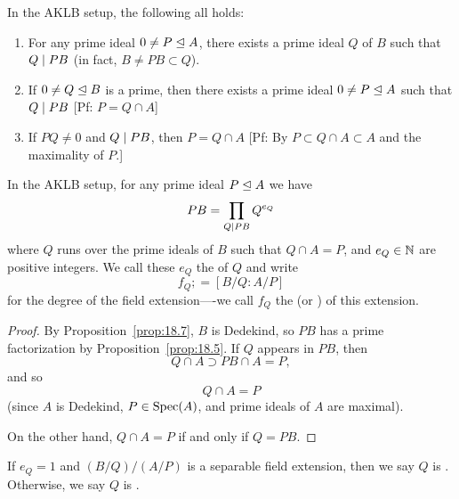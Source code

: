 \begin{fact}
In the AKLB setup, the following all holds:
\begin{enumerate}
\item For any prime ideal $0\neq P\mathrel{\trianglelefteq} A$, there exists a prime
  ideal $Q$ of $B$ such that $Q\mid PB$ (in fact, $B\neq PB\subset Q$).
\item If $0\neq Q\mathrel{\trianglelefteq} B$ is a prime, then there exists a prime ideal $0\neq P\mathrel{\trianglelefteq} A$
  such that $Q\mid PB$ [Pf: $P=Q\cap A$]
\item If $PQ\neq0$ and $Q\mid PB$, then $P=Q\cap A$
  [Pf: By $P\subset Q\cap A\subset A$ and the maximality of $P$.]
\end{enumerate}
\end{fact}

\begin{lemma}\label{lemma:19.2}
In the AKLB setup, for any prime ideal $P\mathrel{\trianglelefteq} A$ we have
\begin{equation}
PB=\prod_{Q\mid PB}Q^{e_{Q}}
\end{equation}
where $Q$ runs over the prime ideals of $B$ such that $Q\cap A=P$,
and $e_{Q}\in\mathbb{N}$ are positive integers. We call these $e_{Q}$ the
 of $Q$ and write
\begin{equation}
f_{Q};=[B/Q : A/P]
\end{equation}
for the degree of the field extension----we call $f_{Q}$ the
 (or ) of this extension.
\end{lemma}

\begin{proof}
By Proposition~\ref{prop:18.7}, $B$ is Dedekind, so $PB$ has a prime
factorization by Proposition~\ref{prop:18.5}. If $Q$ appears in $PB$,
then
\begin{equation}
Q\cap A\supset PB\cap A=P,
\end{equation}
and so
\begin{equation}
Q\cap A=P
\end{equation}
(since $A$ is Dedekind, $P\in\operatorname{Spec}(A)$, and prime ideals of $A$ are maximal).

On the other hand, $Q\cap A=P$ if and only if $Q=PB$.
\end{proof}

\begin{definition}
If $e_{Q}=1$ and $(B/Q)/(A/P)$ is a separable field extension, then we
say $Q$ is . Otherwise, we say $Q$ is .
\end{definition}

